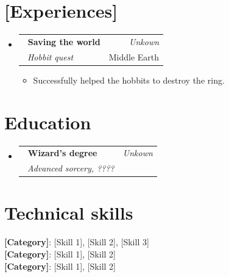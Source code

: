 \documentclass[a4paper,11pt]{article}
\makeatletter
\newcommand{\resumeSubheading}[4]{
\vspace{0.5mm}\item
    \begin{tabular*}{0.98\textwidth}[t]{l@{\extracolsep{\fill}}r}
        \textbf{#1} & \textit{\footnotesize{#4}} \\
        \textit{\footnotesize{#3}} &  \footnotesize{#2}\\
    \end{tabular*}
    \vspace{-2.4mm}
}
\newcommand{\resumeSubHeadingListStart}{\begin{itemize}[leftmargin=*,labelsep=0mm]}
\newcommand{\resumeItemListStart}{\begin{justify}\begin{itemize}[leftmargin=3ex, rightmargin=2ex, noitemsep,labelsep=1.2mm,itemsep=0mm]\small}
\newcommand{\resumeSubHeadingListEnd}{\end{itemize}\vspace{2mm}}
\newcommand{\resumeItemListEnd}{\end{itemize}\end{justify}\vspace{-2mm}}
\makeatother
\begin{document}
\section{\textbf{[Experiences]}}
\resumeSubHeadingListStart
  \resumeSubheading
      {~Saving the world}{Middle Earth} %
      {~Hobbit quest} %
      {Unkown} %
      \vspace{-1.0mm}
      \resumeItemListStart %
        \item {Successfully helped the hobbits to destroy the ring.}
      \resumeItemListEnd


\resumeSubHeadingListEnd
\vspace{-6.5mm}


\section{\textbf{Education}}
  \resumeSubHeadingListStart %
    \resumeSubheading %
      {~Wizard's degree}{}
      {~Advanced sorcery, ????}{Unkown}


  \resumeSubHeadingListEnd
\vspace{-3.5mm}
%

\section{\textbf{Technical skills}}
 \begin{itemize}[leftmargin=0.05in, label={}]
    \small{\item{
     \textbf{[Category]}{: [Skill 1], [Skill 2], [Skill 3]} \\
     \textbf{[Category]}{: [Skill 1], [Skill 2]} \\
     \textbf{[Category]}{: [Skill 1], [Skill 2]}
    }}
 \end{itemize}
 \vspace{-8.5pt}
\end{document}
